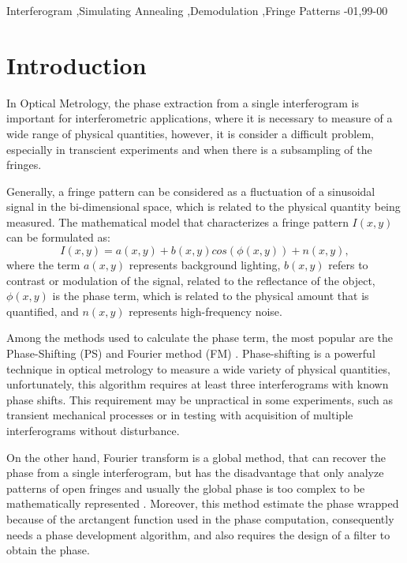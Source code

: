 \documentclass[review]{elsarticle}
\begin{document}
\begin{frontmatter}
\begin{keyword}
Interferogram \sep Simulating Annealing \sep Demodulation \sep Fringe Patterns
-01\sep  99-00
\end{keyword}

\end{frontmatter}


\section{Introduction}

In Optical Metrology, the phase extraction from a single interferogram is important for interferometric applications, where it is necessary to measure of a wide range of physical quantities, however, it is consider a difficult problem, especially in transcient experiments and when there is a subsampling of the fringes.

Generally, a fringe pattern can be considered as a fluctuation of a sinusoidal signal in the bi-dimensional space, which is related to the physical quantity being measured. The mathematical model that characterizes a fringe pattern $I(x,y)$ can be formulated as:
\begin{equation} \label{eq1}
    I(x,y) = a(x,y) +b(x,y)cos(\phi(x,y)) + n(x,y),
\end{equation}
where the term $a(x,y)$ represents background lighting, $b(x, y)$ refers to contrast or modulation of the signal, related to the reflectance of the object, $\phi(x,y)$ is the phase term, which is related to the physical amount that is quantified, and $n(x, y)$ represents high-frequency noise.

Among the methods used to calculate the phase term, the most popular are the Phase-Shifting (PS) \cite{malacara2007optical,Kujawinska1991} and Fourier method (FM) \cite{Takeda:82,Takeda:83}. Phase-shifting is a powerful technique in optical metrology to measure a wide variety of physical quantities, unfortunately, this algorithm requires at least three interferograms with known phase shifts.  This requirement may be unpractical in some experiments, such as transient mechanical processes or in testing with acquisition of multiple interferograms without disturbance.

On the other hand, Fourier transform is a global method, that can recover the phase from a single interferogram, but has the disadvantage that only analyze patterns of open fringes \cite{Takeda:82} and usually the global phase is too complex to be mathematically represented \cite{Bone:86}. Moreover, this method estimate the phase wrapped because of the arctangent function used in the phase computation, consequently  needs a phase development algorithm, and also requires the design of a filter to obtain the phase.
\end{document}
